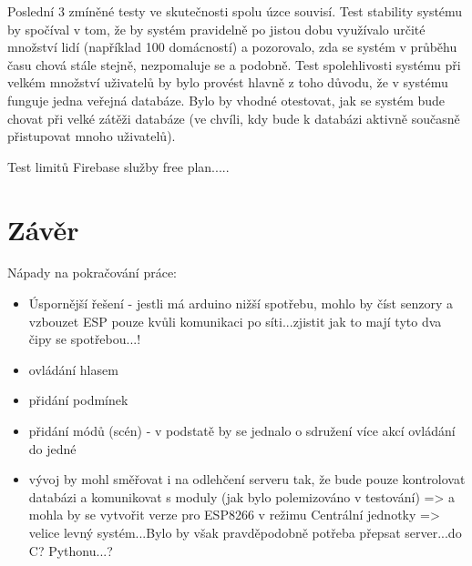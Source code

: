 Poslední 3 zmíněné testy ve skutečnosti spolu úzce souvisí. Test stability systému by spočíval v tom, že by systém pravidelně po jistou dobu využívalo určité množství lidí (například 100 domácností) a pozorovalo, zda se systém v průběhu času chová stále stejně, nezpomaluje se a podobně. Test spolehlivosti systému při velkém množství uživatelů by bylo provést hlavně z toho důvodu, že v systému funguje jedna veřejná databáze. Bylo by vhodné otestovat, jak se systém bude chovat při velké zátěži databáze (ve chvíli, kdy bude k databázi aktivně současně přistupovat mnoho uživatelů).

Test limitů Firebase služby free plan.....








\chapter{Závěr}
\label{zaver}

Nápady na pokračování práce:
\begin{itemize}
    \item Úspornější řešení - jestli má arduino nižší spotřebu, mohlo by číst senzory a vzbouzet ESP pouze kvůli komunikaci po síti...zjistit jak to mají tyto dva čipy se spotřebou...!
    \item ovládání hlasem
    \item přidání podmínek
    \item přidání módů (scén) - v podstatě by se jednalo o sdružení více akcí ovládání do jedné
    \item vývoj by mohl směřovat i na odlehčení serveru tak, že bude pouze kontrolovat databázi a komunikovat s moduly (jak bylo polemizováno v testování) => a mohla by se vytvořit verze pro ESP8266 v režimu Centrální jednotky => velice levný systém...Bylo by však pravděpodobně potřeba přepsat server...do C? Pythonu...?
\end{itemize}

